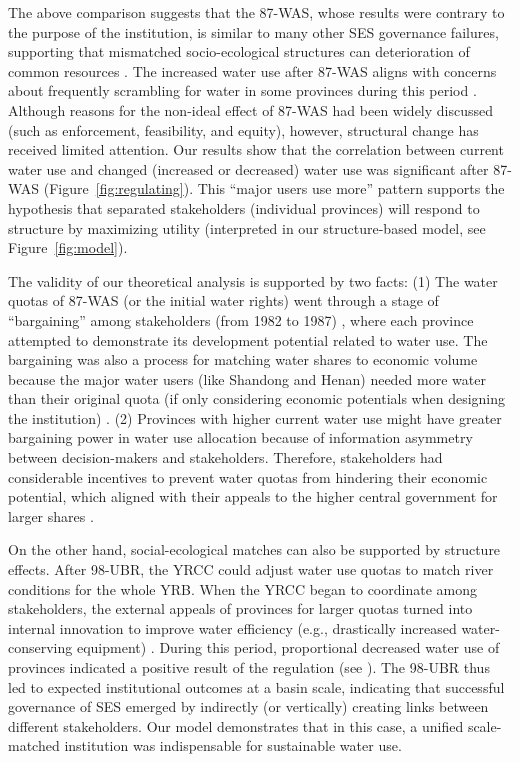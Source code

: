 \documentclass[default, sn-standardnature]{sn-jnl}
\begin{document}
\label{discussion-2}
The above comparison suggests that the 87-WAS, whose results were contrary to the purpose of the institution, is similar to many other SES governance failures, supporting that mismatched socio-ecological structures can deterioration of common resources \cite{kellenberg2009,cai2016,barnes2019}.
The increased water use after 87-WAS aligns with concerns about frequently scrambling for water in some provinces during this period \cite{mao2000, bouckaert2022}.
Although reasons for the non-ideal effect of 87-WAS had been widely discussed \cite{huangang2002} (such as enforcement, feasibility, and equity), however, structural change has received limited attention.
Our results show that the correlation between current water use and changed (increased or decreased) water use was significant after 87-WAS (Figure~\ref{fig:regulating}).
This ``major users use more'' pattern supports the hypothesis that separated stakeholders (individual provinces) will respond to structure by maximizing utility (interpreted in our structure-based model, see Figure~\ref{fig:model}).

The validity of our theoretical analysis is supported by two facts:
(1) The water quotas of 87-WAS (or the initial water rights) went through a stage of ``bargaining'' among stakeholders (from 1982 to 1987) \cite{wang2019e, wang2019d}, where each province attempted to demonstrate its development potential related to water use.
The bargaining was also a process for matching water shares to economic volume because the major water users (like Shandong and Henan) needed more water than their original quota (if only considering economic potentials when designing the institution) \cite{zuo2020}.
(2) Provinces with higher current water use might have greater bargaining power in water use allocation because of information asymmetry between decision-makers and stakeholders.
Therefore, stakeholders had considerable incentives to prevent water quotas from hindering their economic potential, which aligned with their appeals to the higher central government for larger shares \cite{wang2019e, wang2019d}.

\label{discussion-3}
On the other hand, social-ecological matches can also be supported by structure effects.
After 98-UBR, the YRCC could adjust water use quotas to match river conditions for the whole YRB.
When the YRCC began to coordinate among stakeholders, the external appeals of provinces for larger quotas turned into internal innovation to improve water efficiency (e.g., drastically increased water-conserving equipment)
\cite{krieger1955, ostrom1990}.
During this period, proportional decreased water use of provinces indicated a positive result of the regulation (see ).
The 98-UBR thus led to expected institutional outcomes at a basin scale, indicating that successful governance of SES emerged by indirectly (or vertically) creating links between different stakeholders.
Our model demonstrates that in this case, a unified scale-matched institution was indispensable for sustainable water use.
\end{document}

